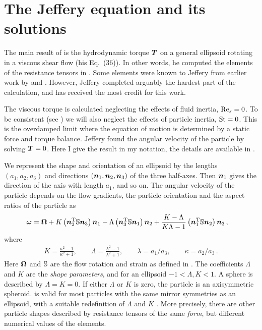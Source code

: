 \documentclass[thesis.tex]{subfiles}
\begin{document}
\section{The Jeffery equation and its solutions}

The main result of \citet{jeffery1922} is the hydrodynamic torque $\mbox{\boldmath$T$}$ on a general ellipsoid rotating in a viscous shear flow (his Eq.~(36)). In other words, he computed the elements of the resistance tensors in . Some elements were known to Jeffery from earlier work by \citet{oberbeck1876} and \citet{edwardes1893}. However, Jeffery completed arguably the hardest part of the calculation, and has received the most credit for this work.

The viscous torque is calculated neglecting the effects of fluid inertia, $\textrm{Re}_s=0$. To be consistent (see ) we will also neglect the effects of particle inertia, $\mbox{St}=0$. This is the overdamped limit where the equation of motion is determined by a static force and torque balance. Jeffery found the angular velocity of the particle by solving $\mbox{\boldmath$T$}=0$. Here I give the result in my notation, the details are available in .

We represent the shape and orientation of an ellipsoid by the lengths $(a_1, a_2, a_3)$ and directions $(\mbox{\boldmath$n$}_1, \mbox{\boldmath$n$}_2, \mbox{\boldmath$n$}_3)$ of the three half-axes. Then $\mbox{\boldmath$n$}_1$ gives the direction of the axis with length $a_1$, and so on. The angular velocity of the particle depends on the flow gradients, the particle orientation and the aspect ratios of the particle as \cite{jeffery1922}
\begin{align}
	\ve \omega &= \ve \Omega
	 + K\left(\ve n_2\transpose \ma S\ve n_3\right)\ve n_1
	 - \Lambda\left(\ve n_3\transpose \ma S\ve n_1\right)\ve n_2
	  + \frac{K- \Lambda}{K \Lambda - 1}\left(\ve n_1\transpose \ma S\ve n_2\right)\ve n_3\,,\eqnlab{triaxialomega}
\end{align}
where
\begin{align}
	K=\frac{\kappa^2-1}{\kappa^2+1}, \qquad \Lambda=\frac{\lambda^2-1}{\lambda^2+1},\qquad \lambda=a_1/a_3, \qquad \kappa=a_2/a_3\,.
\end{align}
Here $\mbox{\boldmath$\Omega$}$ and $\mathbb{S}$ are the flow rotation and strain as defined in . The coefficients $\Lambda$ and $K$ are the \emph{shape parameters}, and for an ellipsoid $-1 < \Lambda, K < 1$. A sphere is described by $\Lambda=K=0$. If either $\Lambda$ or $K$ is zero, the particle is an axisymmetric spheroid.  is valid for most particles with the same mirror symmetries as an ellipsoid, with a suitable redefinition of $\Lambda$ and $K$ \cite{bretherton1962,happel1965,kim1991}. More precisely, there are other particle shapes described by resistance tensors of the same \emph{form}, but different numerical values of the elements.
\end{document}
